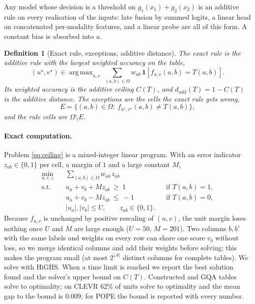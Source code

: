 \documentclass[11pt]{article}
\newtheorem{definition}{Definition}
\newcommand{\1}{\mathbf{1}}
\DeclareMathOperator*{\argmax}{arg\,max}
\begin{document}
\noindent
Any model whose decision is a threshold on $g_1(x_1)+g_2(x_2)$ is an additive rule on every realisation of the inputs:
late fusion by summed logits, a linear head on concatenated per-modality features, and a linear probe are all of this
form. A constant bias is absorbed into $u$.

\begin{definition}[Exact rule, exceptions, additive distance]
The \emph{exact rule} is the additive rule with the largest weighted accuracy on the table,
\begin{equation}\label{eq:ceiling}
  (u^\star,v^\star)\in\argmax_{u,v}\ \sum_{(a,b)\in\Omega} w_{ab}\,\1\!\left[f_{u,v}(a,b)=T(a,b)\right].
\end{equation}
Its weighted accuracy is the \emph{additive ceiling} $C(T)$, and $d_{\mathrm{add}}(T)=1-C(T)$ is the
\emph{additive distance}. The \emph{exceptions} are the cells the exact rule gets wrong,
\begin{equation}
  E=\{(a,b)\in\Omega:\ f_{u^\star,v^\star}(a,b)\neq T(a,b)\},
\end{equation}
and the \emph{rule cells} are $\Omega\setminus E$.
\end{definition}

\paragraph{Exact computation.} Problem \eqref{eq:ceiling} is a mixed-integer linear program. With an error indicator
$z_{ab}\in\{0,1\}$ per cell, a margin of $1$ and a large constant $M$,
\begin{align}
  \min_{u,v,z}\quad & \sum_{(a,b)\in\Omega} w_{ab}\,z_{ab}\\
  \text{s.t.}\quad & u_a+v_b+M z_{ab}\ \ge\ 1 && \text{if } T(a,b)=1,\nonumber\\
  & u_a+v_b-M z_{ab}\ \le\ -1 && \text{if } T(a,b)=0,\nonumber\\
  & |u_a|,|v_b|\le U,\qquad z_{ab}\in\{0,1\}.\nonumber
\end{align}
Because $f_{u,v}$ is unchanged by positive rescaling of $(u,v)$, the unit margin loses nothing once $U$ and $M$ are large
enough ($U=50$, $M=201$). Two columns $b,b'$ with the same labels and weights on every row can share one score $v_b$
without loss, so we merge identical columns and add their weights before solving; this makes the program small
(at most $2^{|\mathcal{A}|}$ distinct columns for complete tables). We solve with HiGHS. When a time limit is reached
we report the best solution found and the solver's upper bound on $C(T)$. Constructed and GQA tables solve to
optimality; on CLEVR 62\% of units solve to optimality and the mean gap to the bound is $0.009$; for POPE the bound is
reported with every number.
\end{document}
